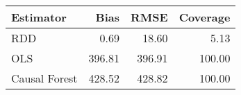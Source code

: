 \begin{table}[ht]
\centering
\begin{tabular}{lrrr}
  \hline
Estimator & Bias & RMSE & Coverage \\ 
  \hline
RDD & 0.69 & 18.60 & 5.13 \\ 
  OLS & 396.81 & 396.91 & 100.00 \\ 
  Causal Forest & 428.52 & 428.82 & 100.00 \\ 
   \hline
\end{tabular}
\end{table}
